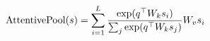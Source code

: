 \documentclass[preview]{standalone}
\begin{document}
\begin{align*}
\special{dvisvgm:raw <g id='unique000'>}\text{AttentivePool}(s) = \sum_{i=1}^L \special{dvisvgm:raw </g>}\special{dvisvgm:raw <g id='unique001'>}\frac{\exp(q^\top W_k s_i)}{\sum_j \exp(q^\top W_k s_j)} \special{dvisvgm:raw </g>}\special{dvisvgm:raw <g id='unique002'>}W_v s_i\special{dvisvgm:raw </g>}
\end{align*}
\end{document}
